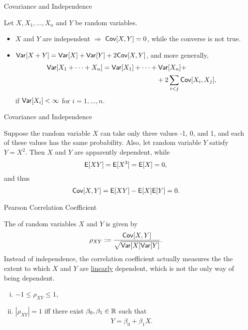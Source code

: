 \begin{frame}{Covariance and Independence}

Let $X, X_1, \ldots, X_n$ and $Y$ be random variables.
\begin{itemize}
	\justifying
	\item $X$ and $Y$ are independent $\Rightarrow$ $\mathsf{Cov}[X, Y] = 0$, while the converse is not true. \\
	\item $\mathsf{Var}[X + Y] = \mathsf{Var}[X] + \mathsf{Var}[Y] + 2\mathsf{Cov}[X, Y]$, and more generally,
	\begin{align*}
	\mathsf{Var}[X_1 + \cdots + X_n] & = \mathsf{Var}[X_1] + \cdots + \mathsf{Var}[X_n] + \\
	& \qquad\qquad\qquad\qquad + 2\sum_{i<j} \mathsf{Cov}[X_i, X_j],
	\end{align*}
	if $\mathsf{Var}[X_i] < \infty$ for $i = 1, \ldots, n$.
\end{itemize}

\end{frame}


\begin{frame}{Covariance and Independence}

\justifying
{} Suppose the random variable $X$ can take only three values -1, 0, and 1, and each of these values has the same probability. Also, let random variable $Y$ satisfy $Y = X^2$. Then $X$ and $Y$ are apparently dependent, while
\begin{align*}
\mathsf{E}[XY] = \mathsf{E}[X^3] = \mathsf{E}[X] = 0,
\end{align*}
and thus
\begin{align*}
\mathsf{Cov}[X, Y] = \mathsf{E}[XY] - \mathsf{E}[X]\mathsf{E}[Y] = 0.
\end{align*}


\end{frame}

\begin{frame}{Pearson Correlation Coefficient}

\justifying
{} The  of random variables $X$ and $Y$ is given by
\begin{align*}
\rho_{XY} := \frac{\mathsf{Cov}[X, Y]}{\sqrt{\mathsf{Var}[X]\mathsf{Var}[Y]}}.
\end{align*}
 Instead of independence, the correlation coefficient actually measures the the extent to which $X$ and $Y$ are \underline{linearly} dependent, which is not the only way of being dependent. \\
\begin{enumerate}[(i).]
	\item $-1\leq \rho_{XY} \leq 1$,
	\item $|\rho_{XY}| = 1$ iff there exist $\beta_0, \beta_1 \in \mathbb{R}$ such that
	\begin{align*}
	 Y = \beta_0 + \beta_1X.
	\end{align*}
\end{enumerate}

\end{frame}

